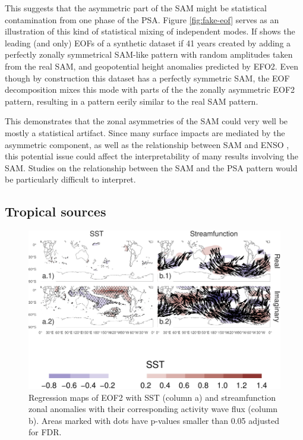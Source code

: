 \documentclass[smallextended]{svjour3}       %
\begin{document}
This suggests that the asymmetric part of the SAM might be statistical contamination from one phase of the PSA. Figure \ref{fig:fake-eof} serves as an illustration of this kind of statistical mixing of independent modes. If shows the leading (and only) EOFs of a synthetic dataset if 41 years created by adding a perfectly zonally symmetrical SAM-like pattern with random amplitudes taken from the real SAM, and geopotential height anomalies predicted by EFO2. Even though by construction this dataset has a perfectly symmetric SAM, the EOF decomposition mixes this mode with parts of the the zonally asymmetric EOF2 pattern, resulting in a pattern eerily similar to the real SAM pattern.

This demonstrates that the zonal asymmetries of the SAM could very well be mostly a statistical artifact. Since many surface impacts are mediated by the asymmetric component, as well as the relationship between SAM and ENSO \citep{campitelli2021}, this potential issue could affect the interpretability of many results involving the SAM. Studies on the relationship between the SAM and the PSA pattern would be particularly difficult to interpret.

\hypertarget{tropical-sources}{%
\subsection{Tropical sources}\label{tropical-sources}}



\begin{figure}
\centering
\includegraphics{../figures/sst-psi-2-1.pdf}
\caption{\label{fig:sst-psi-2}Regression maps of EOF2 with SST (column a) and streamfunction zonal anomalies with their corresponding activity wave flux (column b). Areas marked with dots have p-values smaller than 0.05 adjusted for FDR.}
\end{figure}
\end{document}
